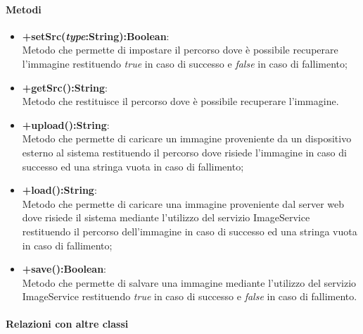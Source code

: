 	\paragraph{Metodi}
	\begin{itemize}
	\item \textbf{+setSrc(\textit{type}:String):Boolean}:\\
		Metodo che permette di impostare il percorso dove è possibile recuperare l'immagine restituendo \textit{true} in caso di successo e \textit{false} in caso di fallimento;
	\item \textbf{+getSrc():String}:\\
		Metodo che restituisce il percorso dove è possibile recuperare l'immagine.
	\item \textbf{+upload():String}:\\
		Metodo che permette di caricare un immagine proveniente da un dispositivo esterno al sistema restituendo il percorso dove risiede l'immagine in caso di successo ed una stringa vuota in caso di fallimento;
	\item \textbf{+load():String}:\\
		Metodo che permette di caricare una immagine proveniente dal server web dove risiede il sistema mediante l'utilizzo del servizio ImageService restituendo il percorso dell'immagine in caso di successo ed una stringa vuota in caso di fallimento;
	\item \textbf{+save():Boolean}:\\
		Metodo che permette di salvare una immagine mediante l'utilizzo del servizio ImageService restituendo \textit{true} in caso di successo e \textit{false} in caso di fallimento.
	\end{itemize}
	\paragraph{Relazioni con altre classi}

